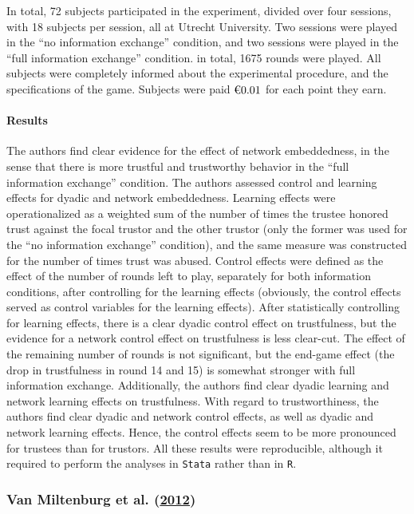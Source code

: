 \documentclass[
  11pt,
]{article}
\begin{document}
In total, 72 subjects participated in the experiment, divided over four sessions, with 18 subjects per session, all at Utrecht University. Two sessions were played in the ``no information exchange'' condition, and two sessions were played in the ``full information exchange'' condition. in total, 1675 rounds were played. All subjects were completely informed about the experimental procedure, and the specifications of the game. Subjects were paid \(\text{\texteuro}0.01\) for each point they earn.

\hypertarget{results-5}{%
\paragraph{Results}\label{results-5}}

The authors find clear evidence for the effect of network embeddedness, in the sense that there is more trustful and trustworthy behavior in the ``full information exchange'' condition.
The authors assessed control and learning effects for dyadic and network embeddedness.
Learning effects were operationalized as a weighted sum of the number of times the trustee honored trust against the focal trustor and the other trustor (only the former was used for the ``no information exchange'' condition), and the same measure was constructed for the number of times trust was abused.
Control effects were defined as the effect of the number of rounds left to play, separately for both information conditions, after controlling for the learning effects (obviously, the control effects served as control variables for the learning effects).
After statistically controlling for learning effects, there is a clear dyadic control effect on trustfulness, but the evidence for a network control effect on trustfulness is less clear-cut.
The effect of the remaining number of rounds is not significant, but the end-game effect (the drop in trustfulness in round 14 and 15) is somewhat stronger with full information exchange.
Additionally, the authors find clear dyadic learning and network learning effects on trustfulness.
With regard to trustworthiness, the authors find clear dyadic and network control effects, as well as dyadic and network learning effects.
Hence, the control effects seem to be more pronounced for trustees than for trustors.
All these results were reproducible, although it required to perform the analyses in \texttt{Stata} rather than in \texttt{R}.

\hypertarget{miltenburg_buskens_triads_2012}{%
\subsubsection{\texorpdfstring{Van Miltenburg et al. (\protect\hyperlink{ref-miltenburg_buskens_triads_2012}{2012})}{Van Miltenburg et al. (2012)}}\label{miltenburg_buskens_triads_2012}}
\end{document}
